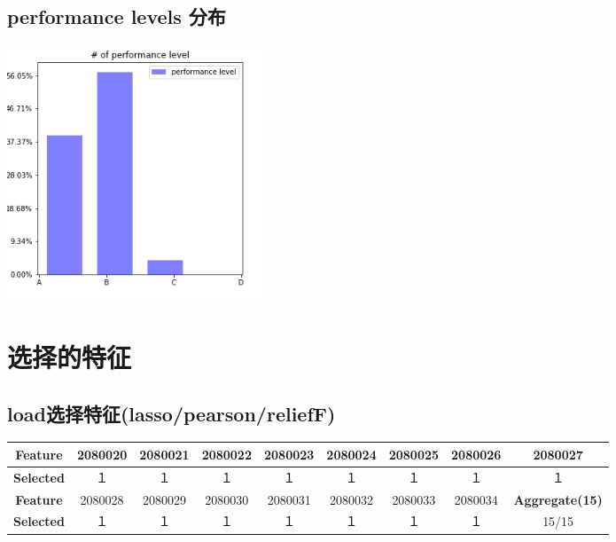 \documentclass[a4paper,UTF8]{article}
\theoremstyle{definition}
\begin{document}
\subsection*{performance levels 分布}
\includegraphics[width=3in]{histograph_of_perf_levels.png}

\section*{选择的特征}
\subsection*{load选择特征(lasso/pearson/reliefF)}
\renewcommand{\arraystretch}{1.2}    
	\begin{tabular}{|c|c|c|c|c|c|c|c|c|}  
		\hline    
		\textbf{Feature} & 2080020 & 2080021 & 2080022 & 2080023 & 2080024 & 2080025 & 2080026 & 2080027   
		\\\hline  
		\textbf{Selected} &１    　  &１        &１        &１        &１        &１        &１        &１       
		\\\hline  
		\textbf{Feature} & 2080028 & 2080029 & 2080030 & 2080031 & 2080032 & 2080033 & 2080034 & \textbf{Aggregate(15)}  
		\\\hline  
		\textbf{Selected} &１       &１        &１        &１        &１        &１        &１        &15/15   
		\\\hline   
	\end{tabular}  
	\vspace{1.5mm}  
\end{document}
